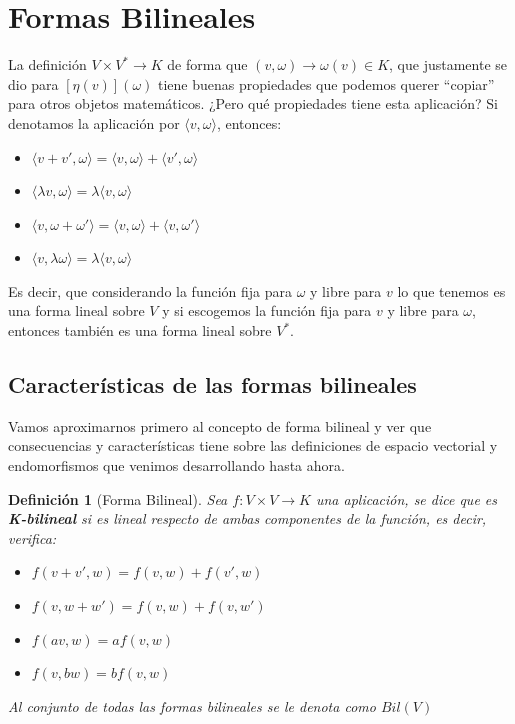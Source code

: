 \documentclass[10pt,a4paper,openright]{book}
\theoremstyle{break}
\newtheorem*{defi}{Definición}
\begin{document}
\section{Formas Bilineales}
\label{Formas bilineales}
La definición $V\times V^* \rightarrow K$ de forma que $(v,\omega)\rightarrow \omega(v)\in K$, que justamente se dio para $\left[\eta(v)\right](\omega)$ tiene buenas propiedades que podemos querer ``copiar'' para otros objetos matemáticos. ¿Pero qué propiedades tiene esta aplicación? Si denotamos la aplicación por $\langle v,\omega\rangle$, entonces:
\begin{itemize}
\item $\langle v+v',\omega\rangle=\langle v,\omega\rangle+\langle v',\omega\rangle$
\item $\langle\lambda v,\omega\rangle = \lambda \langle v,\omega\rangle$
\item $\langle v,\omega+\omega'\rangle =\langle v,\omega\rangle+\langle v,\omega'\rangle$
\item $\langle v,\lambda\omega\rangle = \lambda \langle v,\omega\rangle$
\end{itemize}
Es decir, que considerando la función fija para $\omega$ y libre para $v$ lo que tenemos es una forma lineal sobre $V$ y si escogemos la función fija para $v$ y libre para $\omega$, entonces también es una forma lineal sobre $V^*$.

\subsection{Características de las formas bilineales}
Vamos aproximarnos primero al concepto de forma bilineal y ver que consecuencias y características tiene sobre las definiciones de espacio vectorial y endomorfismos que venimos desarrollando hasta ahora.

\begin{defi}[Forma Bilineal]
Sea $f: V\times V\rightarrow K$ una aplicación, se dice que es \textbf{K-bilineal} si es lineal respecto de ambas componentes de la función, es decir, verifica:
\begin{itemize}
\item $f(v+v',w) = f(v,w)+f(v',w)$
\item $f(v, w+w') = f(v,w)+f(v,w')$
\item $f(av, w)= a f(v,w)$
\item $f(v,bw)=bf(v,w)$
\end{itemize}
Al conjunto de todas las formas bilineales se le denota como $Bil(V)$
\end{defi}
\end{document}
